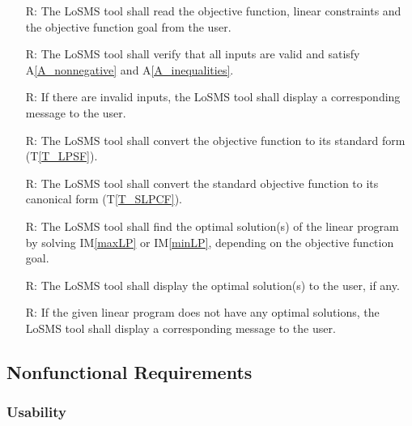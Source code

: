 \documentclass[12pt]{article}
\newcommand{\tref}[1]{T\ref{#1}}
\newcommand{\aref}[1]{A\ref{#1}}
\newcommand{\iref}[1]{IM\ref{#1}}
\newcounter{reqnum} %
\newcommand{\famname}{LoSMS} %
\begin{document}
\noindent 
\begin{itemize}
	\item[R\refstepcounter{reqnum}\thereqnum \label{R_Inputs}:] The \famname{} 
	tool shall read the objective function, linear constraints and the 
	objective function goal from the user.
	
	\item[R\refstepcounter{reqnum}\thereqnum \label{R_HandleInputErrors}:] The 
	\famname{} tool shall verify that all inputs are valid and satisfy 
	\aref{A_nonnegative} and \aref{A_inequalities}.
	
	\item[R\refstepcounter{reqnum}\thereqnum \label{R_DisplayErrorMsg}:] If 
	there are invalid inputs, the \famname{} tool shall display a corresponding 
	message to the user.
	
	\item[R\refstepcounter{reqnum}\thereqnum \label{R_StandardForm}:] The 
	\famname{} tool shall convert the objective function to its standard form 
	(\tref{T_LPSF}).
	
	\item[R\refstepcounter{reqnum}\thereqnum \label{R_CanonicalForm}:] The 
	\famname{} tool shall convert the standard objective function to its 
	canonical form (\tref{T_SLPCF}).

	\item[R\refstepcounter{reqnum}\thereqnum \label{R_Calculate}:] The 
	\famname{} tool shall find the optimal solution(s) of the linear program by 
	solving \iref{maxLP} or \iref{minLP}, depending on the objective function 
	goal.
	
	\item[R\refstepcounter{reqnum}\thereqnum \label{R_Output}:] The \famname{} 
	tool shall display the optimal solution(s) to the user, if any.
	
	\item[R\refstepcounter{reqnum}\thereqnum \label{R_OutputError}:] If the 
	given linear program does not have any optimal solutions, the \famname{} 
	tool shall display a corresponding message to the user.
\end{itemize}

\subsection{Nonfunctional Requirements}

\subsubsection*{Usability}
\end{document}
